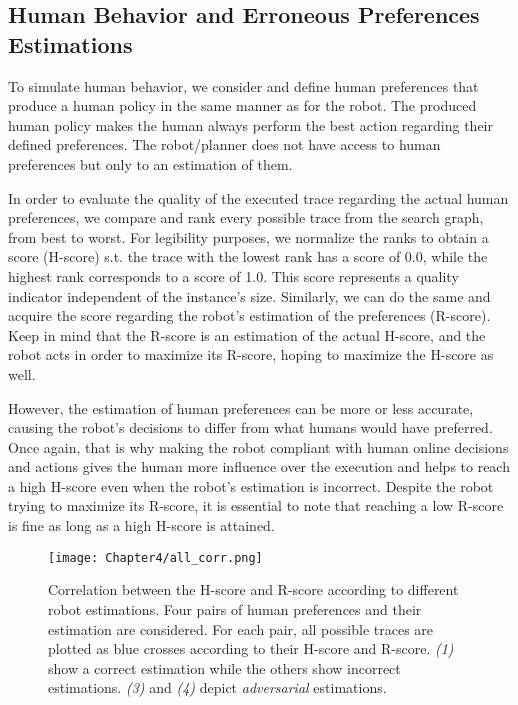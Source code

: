     \subsection{Human Behavior and Erroneous Preferences Estimations}

To simulate human behavior, we consider and define human preferences that produce a human policy in the same manner as for the robot. The produced human policy makes the human always perform the best action regarding their defined preferences. The robot/planner does not have access to human preferences but only to an estimation of them.

In order to evaluate the quality of the executed trace regarding the actual human preferences, we compare and rank every possible trace from the search graph, from best to worst. For legibility purposes, we normalize the ranks to obtain a score (H-score) s.t. the trace with the lowest rank has a score of 0.0, while the highest rank corresponds to a score of 1.0. This score represents a quality indicator independent of the instance's size. 
Similarly, we can do the same and acquire the score regarding the robot's estimation of the preferences (R-score). 
Keep in mind that the R-score is an estimation of the actual H-score, and the robot acts in order to maximize its R-score, hoping to maximize the H-score as well.

However, the estimation of human preferences can be more or less accurate, causing the robot's decisions to differ from what humans would have preferred. Once again, that is why making the robot compliant with human online decisions and actions gives the human more influence over the execution and helps to reach a high H-score even when the robot's estimation is incorrect.
Despite the robot trying to maximize its R-score, it is essential to note that reaching a low R-score is fine as long as a high H-score is attained.

\begin{figure}
    \texttt{[image: Chapter4/all\_corr.png]}
    \caption{
    Correlation between the H-score and R-score according to different robot estimations. Four pairs of human preferences and their estimation are considered. For each pair, all possible traces are plotted as blue crosses according to their H-score and R-score. \textit{(1)} show a correct estimation while the others show incorrect estimations. \textit{(3)} and \textit{(4)} depict \textit{adversarial} estimations.
    }
    \label{fig:corr}
\end{figure}


